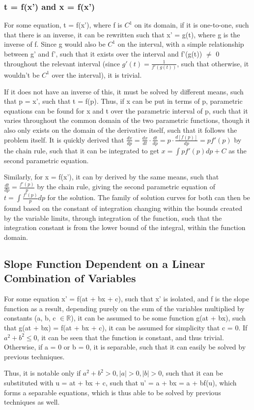 \documentclass[11 pt, twoside]{article}
\begin{document}
\subsubsection*{t = f(x') and x = f(x')}
For some equation, t = f(x'), where f is $C^1$ on its domain, if it is one-to-one, such that there is an inverse, it can be rewritten such that x' = g(t), where g is the inverse of f. Since g would also be $C^1$ on the interval, with a simple relationship between g' and f', such that it exists over the interval and f'(g(t)) $\neq$ 0 throughout the relevant interval (since $g'(t) = \frac{1}{f'(g(t))}$, such that otherwise, it wouldn't be $C^1$ over the interval), it is trivial.

If it does not have an inverse of this, it must be solved by different means, such that p = x', such that t = f(p). Thus, if x can be put in terms of p, parametric equations can be found for x and t over the parametric interval of p, such that it varies throughout the common domain of the two parametric functions, though it also only exists on the domain of the derivative itself, such that it follows the problem itself. It is quickly derived that $\frac{dx}{dp} = \frac{dx}{dt} \cdot \frac{dt}{dp} = p \cdot \frac{d[f(p)]}{dp} = pf'(p)$ by the chain rule, such that it can be integrated to get $x = \int pf'(p)dp + C$ as the second parametric equation. 

Similarly, for x = f(x'), it can by derived by the same means, such that $\frac{dt}{dp} = \frac{f'(p)}{p}$ by the chain rule, giving the second parametric equation of $t = \int \frac{f'(p)}{p}dp$ for the solution. The family of solution curves for both can then be found based on the constant of integration changing within the bounds created by the variable limits, through integration of the function, such that the integration constant is from the lower bound of the integral, within the function domain.

\subsection{Slope Function Dependent on a Linear Combination of Variables}
For some equation x' = f(at + bx + c), such that x' is isolated, and f is the slope function as  a result, depending purely on the sum of the variables multiplied by constants (a, b, c $\in \mathbb{R}$), it can be assumed to be some function g(at + bx), such that g(at + bx) = f(at + bx + c), it can be assumed for simplicity that c = 0. If $a^2 + b^2 \leq 0$, it can be seen that the function is constant, and thus trivial. Otherwise, if a = 0 or b = 0, it is separable, such that it can easily be solved by previous techniques.

Thus, it is notable only if $a^2 + b^2 > 0, |a| > 0, |b| > 0$, such that it can be substituted with u = at + bx + c, such that u' = a + bx = a + bf(u), which forms a separable equations, which is thus able to be solved by previous techniques as well.
\end{document}
